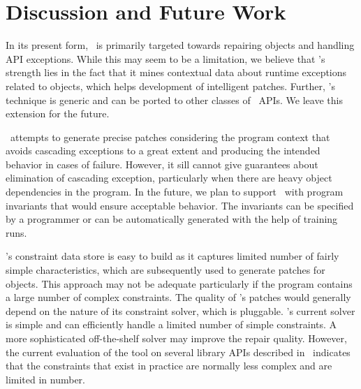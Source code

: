 \section{Discussion and Future Work}
\label{sec:discussion}


\begin{mylist}
 
 \item {} In its present form, \tool\ is
primarily targeted towards repairing  objects and handling API
exceptions. While this may seem to be a limitation, we believe that \tool{}'s
strength lies in the fact that it mines contextual data about runtime exceptions
related to  objects, which helps development of intelligent
patches. Further, \tool{}'s technique is generic and can be ported to other
classes of \java\ APIs. We leave this extension for the future. 

 \item {} \tool\ attempts to generate precise
patches considering the program context that avoids cascading exceptions to a
great extent and producing the intended behavior in cases of failure. However,
it sill cannot give guarantees about elimination of cascading exception,
particularly when there are heavy object dependencies in the program. In the
future, we plan to support \tool\ with program invariants that would ensure
acceptable behavior. The invariants can be specified by a programmer or can be
automatically generated with the help of training runs. 

 \item {} \tool{}'s constraint data
store is easy to build as it captures limited number of fairly simple
 characteristics, which are subsequently used to generate patches
for  objects. This approach may not be adequate particularly if the
program contains a large number of complex constraints. The quality of \tool{}'s
patches would generally depend on the nature of its constraint solver, which is
pluggable. \tool{}'s current solver is simple and can efficiently handle a
limited number of simple constraints. A more sophisticated off-the-shelf solver
may improve the repair quality. However, the current evaluation of the tool on
several library APIs described in~ indicates that the
constraints that exist in practice are normally less complex and are limited in
number.

\end{mylist}